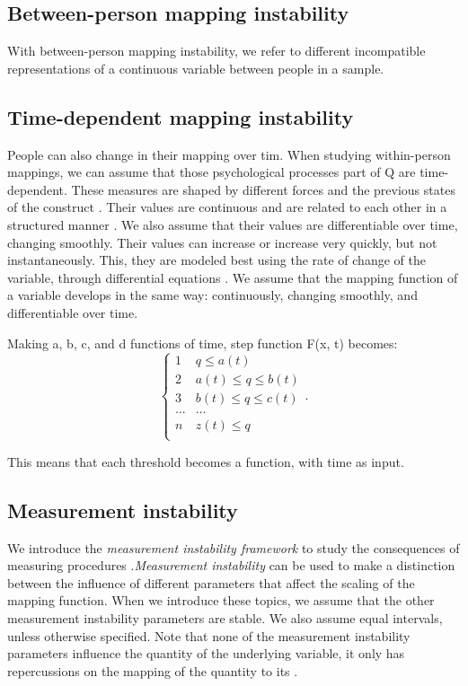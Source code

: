 \documentclass[utf8]{FrontiersinVancouver}
\begin{document}
\subsection{Between-person mapping instability}
With between-person mapping instability, we refer to different incompatible representations of a continuous variable between people in a sample. 

\subsection{Time-dependent mapping instability}
People can also change in their mapping over tim. When studying within-person mappings, we can assume that those psychological processes part of Q are time-dependent. These measures are shaped by different forces and the previous states of the construct \citep{olthofComplexityPsychologicalSelfratings2020b}. Their values are continuous and are related to each other in a structured manner \citep{bokerConsequencesContinuityHunt2002}. We also assume that their values are differentiable over time, changing smoothly. Their values can increase or increase very quickly, but not instantaneously. This, they are modeled best using the rate of change of the variable, through differential equations \citep{molenaarNewPersonSpecificParadigm2009}. We assume that the mapping function of a variable develops in the same way: continuously, changing smoothly, and differentiable over time.

Making a, b, c, and d functions of time, step function F(x, t) becomes: 
\[
\begin{cases} 
    1 & q \leq a(t)\\
    2 & a(t) \leq q \leq b(t)\\
    3 & b(t) \leq q \leq c(t)\\
    \ldots & \ldots\\    
    n & z(t) \leq q\\
\end{cases}.
\]

This means that each threshold becomes a function, with time as input. 

\subsection{Measurement instability}
We introduce the \textit{measurement instability framework} to study the consequences of measuring procedures .\textit{Measurement instability} can be used to make a distinction between the influence of different parameters that affect the scaling of the mapping function. When we introduce these topics, we assume that the other measurement instability parameters are stable. We also assume equal intervals, unless otherwise specified. Note that none of the measurement instability parameters influence the quantity of the underlying variable, it only has repercussions on the mapping of the quantity to its .
\end{document}
